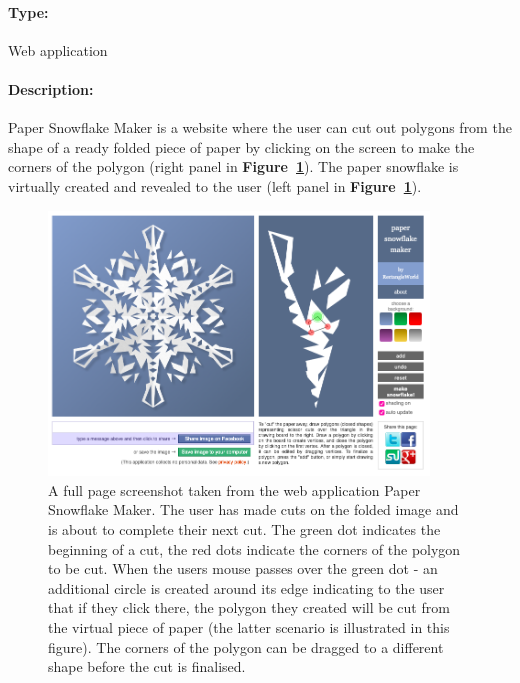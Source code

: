 \documentclass[11pt]{article}
\begin{document}
                \paragraph{Type:} Web application %
                
                \paragraph{Description:}
                Paper Snowflake Maker is a website where the user can cut out polygons from the shape of a ready folded piece of paper by clicking on the screen to make the corners of the polygon (right panel in \textbf{Figure~\ref{fig:paperSnowflakeMaker}}). The paper snowflake is virtually created and revealed to the user (left panel in \textbf{Figure~\ref{fig:paperSnowflakeMaker}}).
                    \begin{figure}[ht]\centering\includegraphics[width=0.9\textwidth]{Images/paperSnowflakeMaker}
                        \caption{
                        \label{fig:paperSnowflakeMaker}
                        A full page screenshot taken from the web application Paper Snowflake Maker. The user has made cuts on the folded image and is about to complete their next cut. The green dot indicates the beginning of a cut, the red dots indicate the corners of the polygon to be cut. When the users mouse passes over the green dot - an additional circle is created around its edge indicating to the user that if they click there, the polygon they created will be cut from the virtual piece of paper (the latter scenario is illustrated in this figure). The corners of the polygon can be dragged to a different shape before the cut is finalised.}
                    \end{figure}
                    
\end{document}
